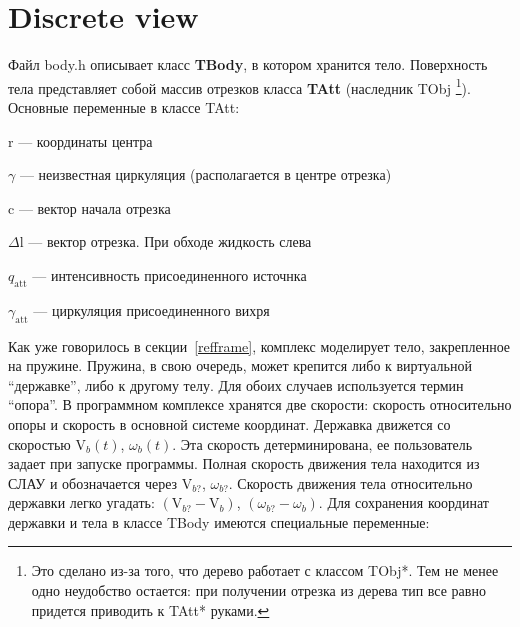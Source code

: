 \documentclass[a4paper,14pt]{extreport}
\newcommand{\br}[1]{\boldsymbol{\mathrm{#1}}}
\renewcommand{\vec}[1]{\br{#1}}
\newcommand{\att}{\text{att}}
\newenvironment{packed_itemize}{
\begin{itemize}
  \setlength{\itemsep}{1pt}
  \setlength{\parskip}{0pt}
  \setlength{\parsep}{0pt}
}{\end{itemize}}
\begin{document}
\section{Discrete view}
\label{tbody}

Файл body.h описывает класс \textbf{TBody}, в котором хранится тело.
Поверхность тела представляет собой массив отрезков класса \textbf{TAtt} (наследник TObj
\footnote{Это сделано из-за того, что дерево работает с классом TObj*. Тем не менее одно неудобство остается: при получении отрезка из дерева тип все равно придется приводить к TAtt* руками.}).\\

Основные переменные в классе TAtt:
\begin{packed_itemize}
\item $\vec r$ --- координаты центра
\item $\gamma$ --- неизвестная циркуляция (располагается в центре отрезка)
\item $\vec c$ --- вектор начала отрезка
\item $\Delta \vec l$ --- вектор отрезка. При обходе жидкость слева
\item $q_\att$ --- интенсивность присоединенного источнка
\item $\gamma_\att$ --- циркуляция присоединенного вихря
\end{packed_itemize}

Как уже говорилось в секции~\ref{refframe}, комплекс моделирует тело, закрепленное на пружине. Пружина, в свою очередь, может крепится либо к виртуальной ``державке'', либо к другому телу. Для обоих случаев используется термин ``опора''.
В программном комплексе хранятся две скорости: скорость относительно опоры и скорость в основной системе координат. Державка движется со скоростью $\vec V_b(t)$, $\omega_b(t)$. Эта скорость детерминирована, ее пользователь задает при запуске программы. Полная скорость движения тела находится из СЛАУ и обозначается через $\vec V_{b?}$, $\omega_{b?}$. Скорость движения тела относительно державки легко угадать: $(\vec V_{b?} - \vec V_b)$, $(\omega_{b?} - \omega_b)$. Для сохранения координат державки и тела в классе TBody имеются специальные переменные: 
\end{document}
